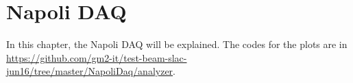 \chapter{Napoli DAQ}
\label{chap:six}

In this chapter, the Napoli DAQ will be explained. The codes for the plots are in \url{https://github.com/gm2-it/test-beam-slac-jun16/tree/master/NapoliDaq/analyzer}.

